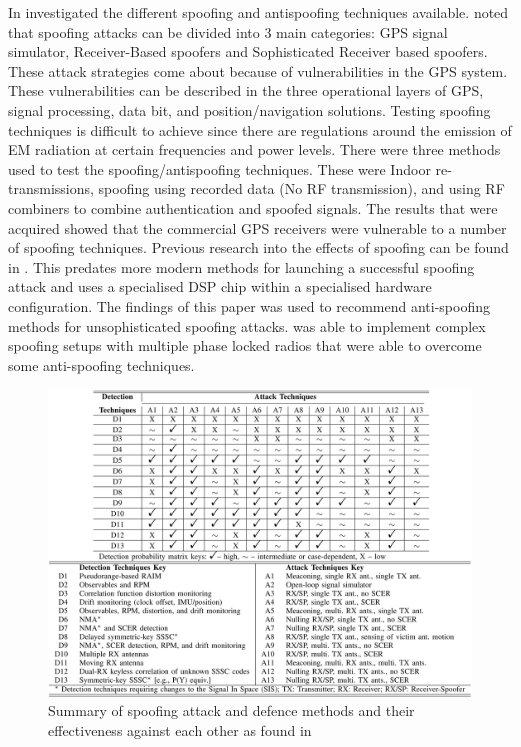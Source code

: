 In \citeyear{RN6} \textcite{RN6} investigated the different spoofing and antispoofing techniques available. \citeauthor{RN6} noted that spoofing attacks can be divided into 3 main categories:
GPS signal simulator, Receiver-Based spoofers and Sophisticated Receiver based spoofers. These attack strategies come about because of vulnerabilities in the GPS system.
These vulnerabilities can be described in the three operational layers of GPS, signal processing, data bit, and position/navigation solutions.
Testing spoofing techniques is difficult to achieve since there are regulations around the emission of EM radiation at certain frequencies and power levels.
There were three methods used to test the spoofing/antispoofing techniques. These were Indoor re-transmissions, spoofing using recorded data (No RF transmission), and
using RF combiners to combine authentication and spoofed signals.
The results that were acquired showed that the commercial GPS receivers were vulnerable to a number of spoofing techniques.
Previous research into the effects of spoofing can be found in \cite{RN23}. This predates more modern methods for launching a successful spoofing attack and uses a
specialised DSP chip within a specialised hardware configuration. The findings of this paper was used to recommend anti-spoofing methods for unsophisticated spoofing
attacks. \citeauthor{RN23} was able to implement complex spoofing setups with multiple phase locked radios that were able to overcome some anti-spoofing techniques. 

\begin{figure}[h]
    \begin{centering}
        \includegraphics[width=14cm, keepaspectratio]{Figures/Attack and defence summary.png}
        \caption{Summary of spoofing attack and defence methods and their effectiveness against each other as found in \cite{RN12}}
    \label{fig:SpoofDefenceSumm}
    \end{centering}
\end{figure}

